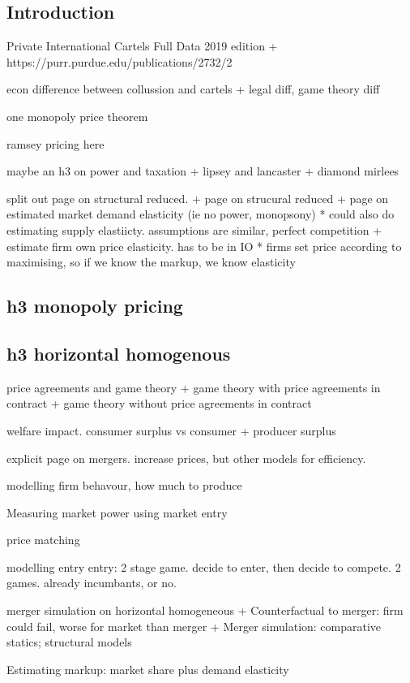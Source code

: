 
\subsection{Introduction}

Private International Cartels Full Data 2019 edition
+ https://purr.purdue.edu/publications/2732/2

econ
	difference between collussion and cartels
	+ legal diff, game theory diff

one monopoly price theorem


ramsey pricing here

maybe an h3 on power and taxation
+ lipsey and lancaster
+ diamond mirlees


split out page on structural reduced.
+ page on strucural reduced
+ page on estimated market demand elasticity (ie no power, monopsony)
  * could also do estimating supply elastiicty. assumptions are similar, perfect competition
+ estimate firm own price elasticity. has to be in IO
  * firms set price according to maximising, so if we know the markup, we know elasticity
\subsection{h3 monopoly pricing}
\subsection{h3 horizontal homogenous}

price agreements and game theory
+ game theory with price agreements in contract
+ game theory without price agreements in contract

welfare impact. consumer surplus vs consumer + producer surplus

explicit page on mergers. increase prices, but other models for efficiency.

modelling firm behavour, how much to produce

Measuring market power using market entry

price matching

modelling entry
entry: 2 stage game. decide to enter, then decide to compete.
2 games. already incumbants, or no.

merger simulation on horizontal homogeneous
+ Counterfactual to merger: firm could fail, worse for market than merger
+ Merger simulation: comparative statics; structural models

Estimating markup: market share plus demand elasticity

